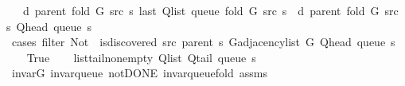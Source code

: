 \begin{isabellebody}
\ \ \ {\isachardoublequoteopen}d\ {\isacharparenleft}{\kern0pt}parent\ {\isacharparenleft}{\kern0pt}fold\ G\ src\ s{\isacharparenright}{\kern0pt}{\isacharparenright}{\kern0pt}\ {\isacharparenleft}{\kern0pt}last\ {\isacharparenleft}{\kern0pt}Q{\isacharunderscore}{\kern0pt}list\ {\isacharparenleft}{\kern0pt}queue\ {\isacharparenleft}{\kern0pt}fold\ G\ src\ s{\isacharparenright}{\kern0pt}{\isacharparenright}{\kern0pt}{\isacharparenright}{\kern0pt}{\isacharparenright}{\kern0pt}\ {\isasymle}\ d\ {\isacharparenleft}{\kern0pt}parent\ {\isacharparenleft}{\kern0pt}fold\ G\ src\ s{\isacharparenright}{\kern0pt}{\isacharparenright}{\kern0pt}\ {\isacharparenleft}{\kern0pt}Q{\isacharunderscore}{\kern0pt}head\ {\isacharparenleft}{\kern0pt}queue\ s{\isacharparenright}{\kern0pt}{\isacharparenright}{\kern0pt}\ {\isacharplus}{\kern0pt}\ {}{\isachardoublequoteclose}%
\endisataginvisible
{\isafoldinvisible}%
%
\isadeliminvisible
\isanewline
%
\endisadeliminvisible
%
\isadelimproof
%
\endisadelimproof
%
\isatagproof
{}\isamarkupfalse%
\ {\isacharparenleft}{\kern0pt}cases\ {\isachardoublequoteopen}filter\ {\isacharparenleft}{\kern0pt}Not\ {\isasymcirc}\ is{\isacharunderscore}{\kern0pt}discovered\ src\ {\isacharparenleft}{\kern0pt}parent\ s{\isacharparenright}{\kern0pt}{\isacharparenright}{\kern0pt}\ {\isacharparenleft}{\kern0pt}G{\isachardot}{\kern0pt}adjacency{\isacharunderscore}{\kern0pt}list\ G\ {\isacharparenleft}{\kern0pt}Q{\isacharunderscore}{\kern0pt}head\ {\isacharparenleft}{\kern0pt}queue\ s{\isacharparenright}{\kern0pt}{\isacharparenright}{\kern0pt}{\isacharparenright}{\kern0pt}\ {\isacharequal}{\kern0pt}\ {\isacharbrackleft}{\kern0pt}{\isacharbrackright}{\kern0pt}{\isachardoublequoteclose}{\isacharparenright}{\kern0pt}\isanewline
\ \ \isamarkupfalse%
\ True\isanewline
\ \ \isamarkupfalse%
\ list{\isacharunderscore}{\kern0pt}tail{\isacharunderscore}{\kern0pt}non{\isacharunderscore}{\kern0pt}empty{\isacharcolon}{\kern0pt}\ {\isachardoublequoteopen}Q{\isacharunderscore}{\kern0pt}list\ {\isacharparenleft}{\kern0pt}Q{\isacharunderscore}{\kern0pt}tail\ {\isacharparenleft}{\kern0pt}queue\ s{\isacharparenright}{\kern0pt}{\isacharparenright}{\kern0pt}\ {\isasymnoteq}\ {\isacharbrackleft}{\kern0pt}{\isacharbrackright}{\kern0pt}{\isachardoublequoteclose}\isanewline
\ \ \ \ \isamarkupfalse%
\ invar{\isacharunderscore}{\kern0pt}G\ invar{\isacharunderscore}{\kern0pt}queue\ not{\isacharunderscore}{\kern0pt}DONE\ invar{\isacharunderscore}{\kern0pt}queue{\isacharunderscore}{\kern0pt}fold{\isacharunderscore}{\kern0pt}{}\ assms\isanewline

\end{isabellebody}
